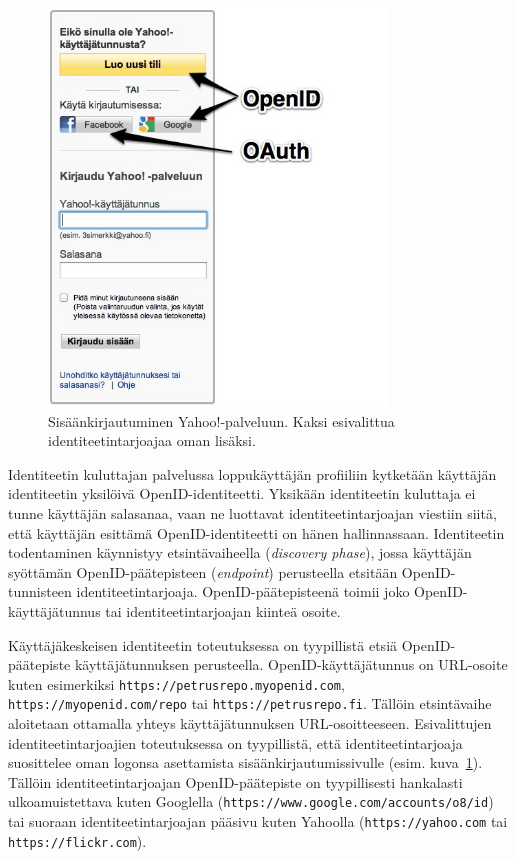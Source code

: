 \documentclass[finnish,gradu]{tktltiki}
\begin{document}
  \begin{figure}
    \centering
    \includegraphics[width=0.8\textwidth]{images/yahoo_login.jpg}
    \caption{Sisäänkirjautuminen Yahoo!-palveluun. Kaksi esivalittua identiteetintarjoajaa oman lisäksi.}
    \label{fig:yahoo_login}
  \end{figure}

  Identiteetin kuluttajan palvelussa loppukäyttäjän profiiliin kytketään käyttäjän identiteetin yksilöivä OpenID-identiteetti. Yksikään identiteetin kuluttaja ei tunne käyttäjän salasanaa, vaan ne luottavat identiteetintarjoajan viestiin siitä, että käyttäjän esittämä OpenID-identiteetti on hänen hallinnassaan.  Identiteetin todentaminen käynnistyy etsintävaiheella (\emph{discovery phase}), jossa käyttäjän syöttämän OpenID-päätepisteen (\emph{endpoint}) perusteella etsitään OpenID-tunnisteen identiteetintarjoaja. OpenID-päätepisteenä toimii joko OpenID-käyttäjätunnus tai identiteetintarjoajan kiinteä osoite.

  Käyttäjäkeskeisen identiteetin toteutuksessa on tyypillistä etsiä OpenID-päätepiste käyttäjätunnuksen perusteella. OpenID-käyttäjätunnus on URL-osoite kuten esimerkiksi \verb!https://petrusrepo.myopenid.com!, \verb!https://myopenid.com/repo! tai \verb!https://petrusrepo.fi!. Tällöin etsintävaihe aloitetaan ottamalla yhteys käyttäjätunnuksen URL-osoitteeseen. Esivalittujen identiteetintarjoajien toteutuksessa on tyypillistä, että identiteetintarjoaja suosittelee oman logonsa asettamista sisäänkirjautumissivulle (esim. kuva~\ref{fig:yahoo_login}). Tällöin identiteetintarjoajan OpenID-päätepiste on tyypillisesti hankalasti ulkoamuistettava kuten Googlella (\verb!https://www.google.com/accounts/o8/id!) tai suoraan identiteetintarjoajan pääsivu kuten Yahoolla (\verb!https://yahoo.com! tai \verb!https://flickr.com!).
\end{document}
